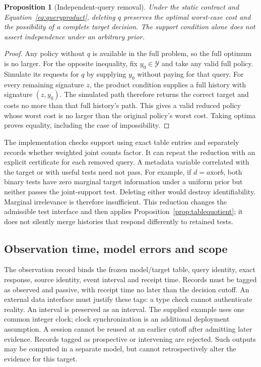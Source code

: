 \documentclass[11pt,a4paper]{article}
\newtheorem{proposition}[theorem]{Proposition}
\theoremstyle{definition}\newtheorem{definition}[theorem]{Definition}
\begin{document}
\begin{proposition}[Independent-query removal]\label{prop:queryremoval}
Under the static contract and Equation~\eqref{eq:queryproduct}, deleting $q$ preserves the optimal worst-case cost and the possibility of a complete target decision. The support condition alone does not assert independence under an arbitrary prior.
\end{proposition}
\begin{proof}
Any policy without $q$ is available in the full problem, so the full optimum is no larger. For the opposite inequality, fix $y_0\in\mathcal Y$ and take any valid full policy. Simulate its requests for $q$ by supplying $y_0$ without paying for that query. For every remaining signature $z$, the product condition supplies a full history with signature $(z,y_0)$. The simulated path therefore returns the correct target and costs no more than that full history's path. This gives a valid reduced policy whose worst cost is no larger than the original policy's worst cost. Taking optima proves equality, including the case of impossibility.
\end{proof}

The implementation checks support using exact table entries and separately records whether weighted joint counts factor. It can repeat the reduction with an explicit certificate for each removed query. A metadata variable correlated with the target or with useful tests need not pass. For example, if $d=a\mathbin{\mathrm{xor}}b$, both binary tests have zero marginal target information under a uniform prior but neither passes the joint-support test. Deleting either would destroy identifiability. Marginal irrelevance is therefore insufficient. This reduction changes the admissible test interface and then applies Proposition~\ref{prop:tablequotient}; it does not silently merge histories that respond differently to retained tests.

\subsection{Observation time, model errors and scope}
The observation record binds the frozen model/target table, query identity, exact response, source identity, event interval and receipt time. Records must be tagged as observed and passive, with receipt time no later than the decision cutoff. An external data interface must justify these tags: a type check cannot authenticate reality. An interval is preserved as an interval. The supplied example uses one common integer clock; clock synchronization is an additional deployment assumption. A session cannot be reused at an earlier cutoff after admitting later evidence. Records tagged as prospective or intervening are rejected. Such outputs may be computed in a separate model, but cannot retrospectively alter the evidence for this target.
\end{document}
